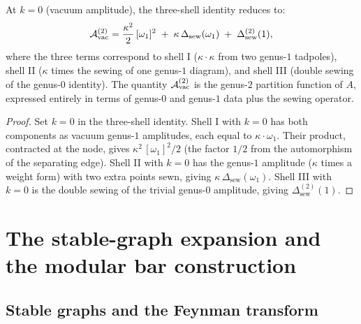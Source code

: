 \begin{corollary}
At $k = 0$ (vacuum amplitude), the three-shell identity
reduces to:
\begin{equation}
\mathcal{A}^{(2)}_{\mathrm{vac}}
= \frac{\kappa^2}{2}\,[\omega_1]^2
\;+\; \kappa\,\Delta_{\mathrm{sew}}(\omega_1)
\;+\; \Delta_{\mathrm{sew}}^{(2)}(1),
\end{equation}
where the three terms correspond to shell I ($\kappa \cdot \kappa$
from two genus-$1$ tadpoles), shell II ($\kappa$ times the sewing
of one genus-$1$ diagram), and shell III (double sewing of the
genus-$0$ identity). The quantity $\mathcal{A}^{(2)}_{\mathrm{vac}}$ is
the genus-$2$ partition function of $A$, expressed entirely in
terms of genus-$0$ and genus-$1$ data plus the sewing operator.
\end{corollary}

\begin{proof}
Set $k = 0$ in the three-shell identity. Shell I with $k = 0$
has both components as vacuum genus-$1$ amplitudes, each equal to
$\kappa \cdot \omega_1$. Their product, contracted at the node,
gives $\kappa^2\,[\omega_1]^2 / 2$ (the factor $1/2$ from the
automorphism of the separating edge). Shell II with $k = 0$ has
the genus-$1$ amplitude ($\kappa$ times a weight form) with two
extra points sewn, giving $\kappa\,\Delta_{\mathrm{sew}}(\omega_1)$.
Shell III with $k = 0$ is the double sewing of the trivial genus-$0$
amplitude, giving $\Delta_{\mathrm{sew}}^{(2)}(1)$.
\end{proof}


\section{The stable-graph expansion and the modular bar construction}
\label{sec:thqg-bv-ext-stable-graph}
\subsection{Stable graphs and the Feynman transform}


